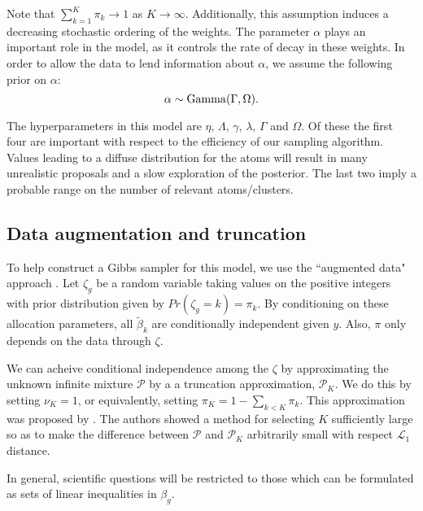 Note that $\sum_{k=1}^K \pi_k \rightarrow 1$ as $K\rightarrow \infty$. Additionally, this assumption induces a decreasing stochastic ordering of the weights. The parameter $\alpha$ plays an important role in the model, as it controls the rate of decay in these weights. In order to allow the data to lend information about $\alpha$, we assume the following prior on $\alpha$:
\begin{equation}
\alpha \sim \operatorname{Gamma}(\Gamma, \Omega).
\end{equation}

The hyperparameters in this model are $\eta, \,\Lambda, \,\gamma, \,\lambda, \,\Gamma$ and $\Omega$. Of these the first four are important with respect to the efficiency of our sampling algorithm. Values leading to a diffuse distribution for the atoms will result in many unrealistic proposals and a slow exploration of the posterior. The last two imply a probable range on the number of relevant atoms/clusters.

\subsection{Data augmentation and truncation}
To help construct a Gibbs sampler for this model, we use the ``augmented data" approach \cite{tanner}. Let $\zeta_g$ be a random variable taking values on the positive integers with prior distribution given by $Pr(\zeta_g=k)=\pi_k$. By conditioning on these allocation parameters, all $\tilde{\beta}_k$ are conditionally independent given $y$. Also, $\pi$ only depends on the data through $\zeta$.

We can acheive conditional independence among the $\zeta$ by approximating the unknown infinite mixture $\mathcal{P}$ by a a truncation approximation, $\mathcal{P}_K$. We do this by setting $\nu_K=1$, or equivalently, setting $\pi_K = 1 - \sum_{k<K} \pi_k$. This approximation was proposed by \citet{ishwaran2000}. The authors showed a method for selecting $K$ sufficiently large so as to make the difference between $\mathcal{P}$ and $\mathcal{P}_K$ arbitrarily small with respect $\mathcal{L}_1$ distance. 

In general, scientific questions will be restricted to those which can be formulated as sets of linear inequalities in $\beta_g$. 

